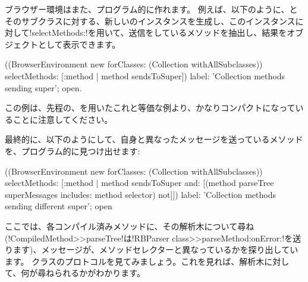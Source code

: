 \documentclass[a4paper,10pt,twoside]{book}
\begin{document}
ブラウザー環境はまた、プログラム的に作れます。
例えば、以下のように、とそのサブクラスに対する、新しいのインスタンスを生成し、このインスタンスに対して\ct!selectMethods:!を用いて、\super{}送信をしているメソッドを抽出し、結果をオブジェクトとして表示できます。
\begin{code}{}
((BrowserEnvironment new forClasses: (Collection withAllSubclasses))
	selectMethods: [:method | method sendsToSuper])
	label: 'Collection methods sending super';
	open.
\end{code}{}

この例は、先程の、を用いたこれと等価な例より、かなりコンパクトになっていることに注意してください。%

最終的に、以下のようにして、自身と異なった\super{}メッセージを送っているメソッドを、プログラム的に見つけ出せます:
\begin{code}{}
((BrowserEnvironment new forClasses: (Collection withAllSubclasses))
	selectMethods: [:method | 
		method sendsToSuper
		and: [(method parseTree superMessages includes: method selector) not]])
	label: 'Collection methods sending different super';
	open
\end{code}
ここでは、各コンパイル済みメソッドに、その解析木について尋ね(\ct!CompiledMethod>>parseTree!は\ct!RBParser class>>parseMethod:onError:!を送ります)、\super{}メッセージが、メソッドセレクターと異なっているかを探り出しています。%
クラスのプロトコルを見てみましょう。これを見れば、解析木に対して、何が尋ねられるかがわかります。%

\end{document}
